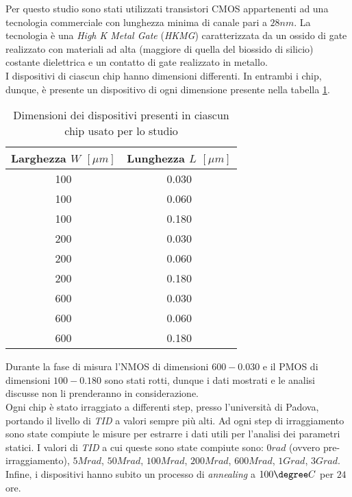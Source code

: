 Per questo studio sono stati utilizzati transistori CMOS appartenenti ad una tecnologia commerciale con lunghezza minima di canale pari a $28nm$. La tecnologia è una \textit{High K Metal Gate} (\textit{HKMG}) caratterizzata da un ossido di gate realizzato con materiali ad alta (maggiore di quella del biossido di silicio) costante dielettrica e un contatto di gate realizzato in metallo.\\

I dispositivi di ciascun chip hanno dimensioni differenti. In entrambi i chip, dunque, è presente un dispositivo di ogni dimensione presente nella tabella \ref{tab:dimensioniMOSFET}.

\begin{table}[ht]
  \renewcommand{\arraystretch}{1.3}
  \centering
    \begin{tabular}{c c }
      \toprule
          Larghezza $W$ $[\mu m]$ & Lunghezza $L$ $[\mu m]$ \\
     \midrule
	   100 & 0.030 \\
	\hline
	   100 & 0.060 \\
	\hline
	   100 & 0.180 \\
	\hline
	   200 & 0.030 \\
 	\hline
	   200 & 0.060 \\
	\hline
	   200 & 0.180 \\
	\hline
 	   600 & 0.030 \\
	\hline
	   600 & 0.060 \\
	\hline
	   600 & 0.180 \\
      \bottomrule
    \end{tabular}
 
  \caption{Dimensioni dei dispositivi presenti in ciascun chip usato per lo studio}
  \label{tab:dimensioniMOSFET}
\end{table}

Durante la fase di misura l'NMOS di dimensioni $600-0.030$ e il PMOS di dimensioni $100-0.180$ sono stati rotti, dunque i dati mostrati e le analisi discusse non li prenderanno in considerazione.\\

Ogni chip è stato irraggiato a differenti step, presso l'università di Padova, portando il livello di \emph{TID} a valori sempre più alti. Ad ogni step di irraggiamento sono state compiute le misure per estrarre i dati utili per l'analisi dei parametri statici. I valori di \emph{TID} a cui queste sono state compiute sono: $0 rad$ (ovvero pre-irraggiamento), $5 Mrad$, $50 Mrad$, $100 Mrad$, $200 Mrad$, $600 Mrad$, $1 Grad$, $3 Grad$. Infine, i dispositivi hanno subito un processo di \emph{annealing} a $100\degree C$ per $24$ ore.

